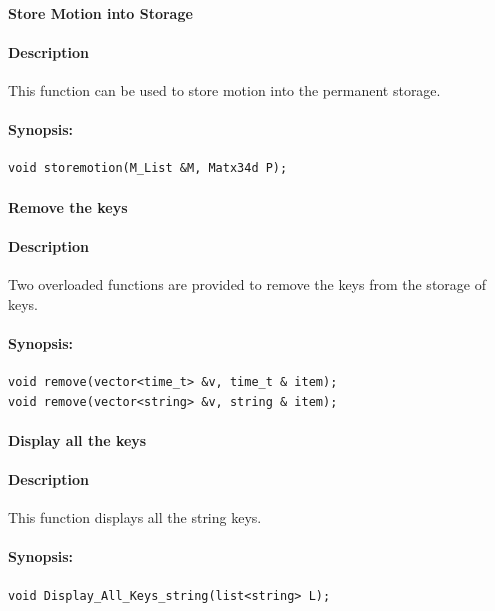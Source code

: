 \paragraph{ Store  Motion into  Storage}
\paragraph{Description}
This function can be used to store motion into the permanent storage. 
\paragraph{Synopsis:}
\begin{lstlisting}
void storemotion(M_List &M, Matx34d P);
\end{lstlisting}


\paragraph{Remove the keys}
\paragraph{Description}
Two overloaded functions are provided to remove the keys from the storage of keys.
\paragraph{Synopsis:}
\begin{lstlisting}
void remove(vector<time_t> &v, time_t & item);
void remove(vector<string> &v, string & item);
\end{lstlisting}


\paragraph{Display all the keys}
\paragraph{Description}
This function displays all the string keys. 

\paragraph{Synopsis:}
\begin{lstlisting}
void Display_All_Keys_string(list<string> L);
\end{lstlisting}



